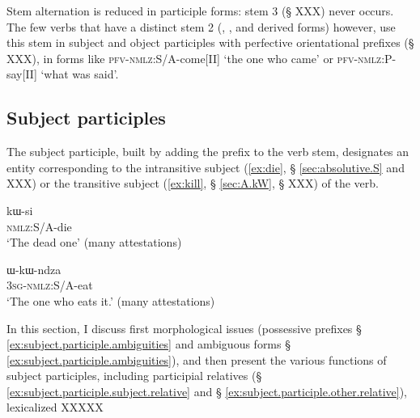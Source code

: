 \begin{table}[h]
\caption{The template of participial verb forms in Japhug} \centering \label{tab:template.nmlz}
\end{table}

Stem alternation is reduced in participle forms: stem 3 (§ XXX) never occurs. The few verbs that have a distinct stem 2 (, ,  and derived forms) however, use this stem in subject and object participles with perfective orientational prefixes (§ XXX), in forms like  \textsc{pfv}-\textsc{nmlz}:S/A-come[II] `the one who came'
or  \textsc{pfv}-\textsc{nmlz}:P-say[II] `what was said'.
 

\subsection{Subject participles}
The subject participle, built by adding the prefix  to the verb stem, designates an entity corresponding to the intransitive subject (\ref{ex:die}, § \ref{sec:absolutive.S} and XXX) or the transitive subject (\ref{ex:kill}, § \ref{sec:A.kW}, § XXX) of the verb. 

 \begin{exe}
\ex \label{ex:kWsi}
\gll kɯ-si    \\
  \textsc{nmlz}:S/A-die \\
 \glt  `The dead one' (many attestations)
\end{exe}

 \begin{exe} 
\ex \label{ex:WkWndza}
\gll ɯ-kɯ-ndza    \\
  \textsc{3sg}-\textsc{nmlz}:S/A-eat \\
 \glt  `The one who eats it.' (many attestations)
\end{exe}

In this section, I discuss first morphological issues (possessive prefixes § \ref{ex:subject.participle.ambiguities} and ambiguous forms § \ref{ex:subject.participle.ambiguities}), and then present the various functions of subject participles, including participial relatives (§ \ref{ex:subject.participle.subject.relative} and § \ref{ex:subject.participle.other.relative}), lexicalized  XXXXX

